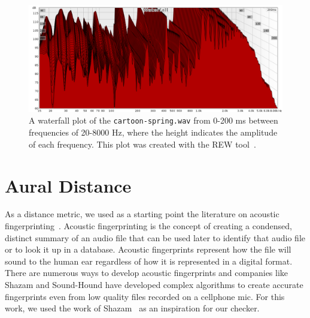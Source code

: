 
\begin{figure}[!ht]
\includegraphics[width=\textwidth]{figs/waterfall} 
\caption{A waterfall plot of the \texttt{cartoon-spring.wav} from 0-200 ms between frequencies of 20-8000 Hz, where the height indicates the amplitude of each frequency. This plot was created with the REW tool~\cite{REWTool}.}
\label{fig:waterfall}
\end{figure}

\section{Aural Distance}
\label{sec:distance}

As a distance metric, we used as a starting point the literature on acoustic fingerprinting~\cite{fingerprinting}.
Acoustic fingerprinting is the concept of creating a condensed, distinct summary of an audio file that can be used later to identify that audio file or to look it up in a database.
Acoustic fingerprints represent how the file will sound to the human ear regardless of how it is represented in a digital format.
There are numerous ways to develop acoustic fingerprints and companies like Shazam and Sound-Hound have developed complex algorithms to create accurate fingerprints even from low quality files recorded on a cellphone mic.
For this work, we used the work of Shazam~\cite{wang2003industrial} as an inspiration for our checker.


